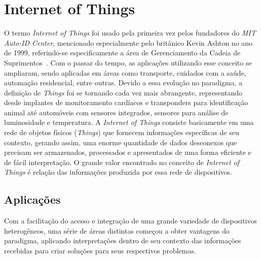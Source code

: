 \section{Internet of Things}
\label{sec:IoT}
O termo \textit{Internet of Things} foi usado pela primeira vez pelos fundadores do \textit{MIT Auto-ID Center},
mencionado especialmente pelo britânico Kevin Ashton no ano de 1999, referindo-se especificamente a área de
Gerenciamento da Cadeia de Suprimentos~\cite{kevinashton2009}. Com o passar do tempo, as aplicações utilizando
esse conceito se ampliaram, sendo aplicadas em áreas como transporte, cuidados com a saúde, automação residencial,
entre outras. Devido a essa evolução no paradigma, a definição de \textit{Things} foi se tornando cada vez mais
abrangente, representando desde implantes de monitoramento cardíacos e transponders para identificação animal
até automóveis com sensores integrados, sensores para análise de luminosidade e temperatura.
A \textit{Internet of Things} consiste basicamente em uma rede de objetos físicos (\textit{Things}) que fornecem
informações específicas de seu contexto, gerando assim, uma enorme quantidade de dados desconexos que precisam
ser armazenados, processados e apresentados de uma forma eficiente e de fácil interpretação. O grande valor
encontrado no conceito de \textit{Internet of Things} é relação das informações produzida por essa rede de
dispositivos.

\subsection{Aplicações}
Com a facilitação do acesso e integração de uma grande variedade de dispositivos heterogêneos, uma série de
áreas distintas começou a obter vantagens do paradigma, aplicando interpretações dentro de seu contexto
das informações recebidas para criar soluções para seus respectivos problemas.

\label{sec:IoTAp}
